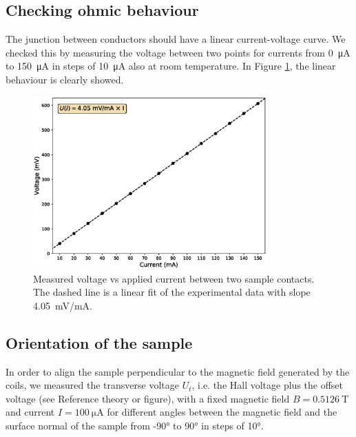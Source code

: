 \documentclass[11pt,a4paper]{article}
\begin{document}
\subsection{Checking ohmic behaviour}

The junction between conductors should have a linear current-voltage curve. We checked this by measuring the voltage between two points for currents from \SI{0}{\micro\ampere} to \SI{150}{\micro\ampere} in steps of \SI{10}{\micro\ampere} also at room temperature. In Figure \ref{fig:ohmic_check}, the linear behaviour is clearly showed.

\begin{figure}[H]
\centering
\includegraphics[width=0.8\textwidth]{Voltage_vs_current_ohmic_test.eps}
\caption{Measured voltage vs applied current between two sample contacts. The dashed line is a linear fit of the experimental data with slope \SI{4.05}{\milli\volt/\milli\ampere}.}
\label{fig:ohmic_check}
\end{figure}

\subsection{Orientation of the sample}

In order to align the sample perpendicular to the magnetic field generated by the coils, we measured the transverse voltage $U_t$, i.e. the Hall voltage plus the offset voltage (see {\color{red}Reference theory or figure}), with a fixed magnetic field $B=\SI{0.5126}{\tesla}$ and current $I=\SI{100}{\micro\ampere}$ for different angles between the magnetic field and the surface normal of the sample from \ang{-90} to \ang{90} in steps of \ang{10}.
\end{document}
